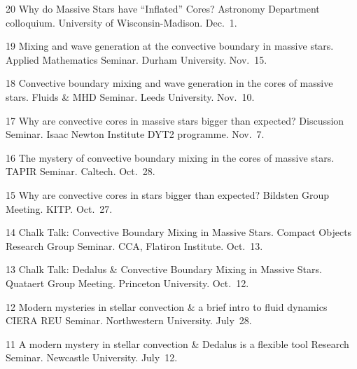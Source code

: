 
      {20}
      { 
        Why do Massive Stars have ``Inflated'' Cores?
      }
      {
        Astronomy Department colloquium. University of Wisconsin-Madison. Dec.~1.
      }

\cvpub{}
      {19}
      {
        Mixing and wave generation at the convective boundary in massive stars.  
      }
      {
        Applied Mathematics Seminar. Durham University. Nov.~15.
      }

\cvpub{}
      {18}
      {
         Convective boundary mixing and wave generation in the cores of massive stars. 
      }
      {
        Fluids \& MHD Seminar. Leeds University. Nov.~10.
      }

\cvpub{}
      {17}
      {
        Why are convective cores in massive stars bigger than expected?  
      }
      {
        Discussion Seminar. Isaac Newton Institute DYT2 programme. Nov.~7.
      }



\cvpub{}
      {16}
      {
        The mystery of convective boundary mixing in the cores of massive stars.
      }
      {
        TAPIR Seminar. Caltech. Oct.~28.
      }

\cvpub{}
      {15}
      {
        Why are convective cores in stars bigger than expected?  
      }
      {
        Bildsten Group Meeting. KITP. Oct.~27.
      }

\cvpub{}
      {14}
      {
        Chalk Talk: Convective Boundary Mixing in Massive Stars.  
      }
      {
        Compact Objects Research Group Seminar. CCA, Flatiron Institute. Oct.~13.
      }

\cvpub{}
      {13}
      {
        Chalk Talk: Dedalus \& Convective Boundary Mixing in Massive Stars.  
      }
      {
        Quataert Group Meeting. Princeton University. Oct.~12.
      }



\cvpub{}
      {12}
      {  
        Modern mysteries in stellar convection \& a brief intro to fluid dynamics
      }
      {
        CIERA REU Seminar. Northwestern University. July~28.
      }



\cvpub{}
      {11}
      { A modern mystery in stellar convection \& Dedalus is a flexible tool }
      {
        Research Seminar. Newcastle University. July~12.
      }

